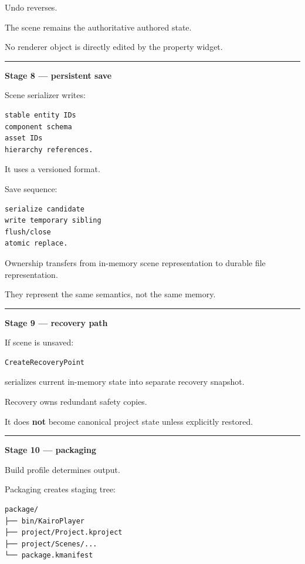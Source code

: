 Undo reverses.

The scene remains the authoritative authored state.

No renderer object is directly edited by the property widget.

\begin{center}\rule{0.5\linewidth}{0.5pt}\end{center}

\textbf{Stage 8 --- persistent save}

Scene serializer writes:

\begin{verbatim}
stable entity IDs
component schema
asset IDs
hierarchy references.
\end{verbatim}

It uses a versioned format.

Save sequence:

\begin{verbatim}
serialize candidate
write temporary sibling
flush/close
atomic replace.
\end{verbatim}

Ownership transfers from in-memory scene representation to durable file representation.

They represent the same semantics, not the same memory.

\begin{center}\rule{0.5\linewidth}{0.5pt}\end{center}

\textbf{Stage 9 --- recovery path}

If scene is unsaved:

\begin{verbatim}
CreateRecoveryPoint
\end{verbatim}

serializes current in-memory state into separate recovery snapshot.

Recovery owns redundant safety copies.

It does \textbf{not} become canonical project state unless explicitly restored.

\begin{center}\rule{0.5\linewidth}{0.5pt}\end{center}

\textbf{Stage 10 --- packaging}

Build profile determines output.

Packaging creates staging tree:

\begin{verbatim}
package/
├── bin/KairoPlayer
├── project/Project.kproject
├── project/Scenes/...
└── package.kmanifest
\end{verbatim}


